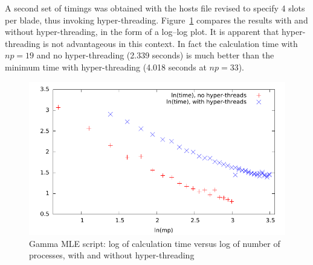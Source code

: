 \documentclass{article}
\begin{document}
A second set of timings was obtained with the hosts file revised to
specify 4 slots per blade, thus invoking
hyper-threading. Figure~\ref{fig:gamma-log} compares the results with
and without hyper-threading, in the form of a log--log plot. It is
apparent that hyper-threading is not advantageous in this context.  In
fact the calculation time with $np=19$ and no hyper-threading (2.339
seconds) is much better than the minimum time with hyper-threading
(4.018 seconds at $np=33$).

\begin{figure}[htbp]
  \centering
  \includegraphics[scale=0.8]{figures/gamma-log}
  \caption{Gamma MLE script: log of calculation time versus log of
    number of processes, with and without hyper-threading}
  \label{fig:gamma-log}
\end{figure}
\end{document}
